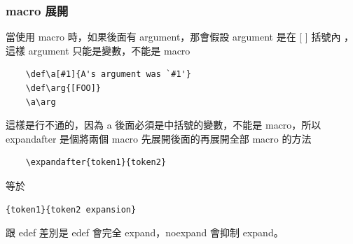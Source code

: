    \subsubsection{macro 展開}
    當使用 macro 時，如果後面有 argument，那會假設 argument 是在 [ ] 括號內
    ，這樣 argument 只能是變數，不能是 macro
    \begin{verbatim}
    \def\a[#1]{A's argument was `#1'}
    \def\arg{[FOO]}
    \a\arg
    \end{verbatim}
    這樣是行不通的，因為 a 後面必須是中括號的變數，不能是 macro，所以
    expandafter 是個將兩個 macro 先展開後面的再展開全部 macro 的方法
    \begin{verbatim}
    \expandafter{token1}{token2}
    \end{verbatim}
    等於
    \begin{verbatim}
{token1}{token2 expansion}
    \end{verbatim}
    跟 edef 差別是 edef 會完全 expand，noexpand 會抑制 expand。

